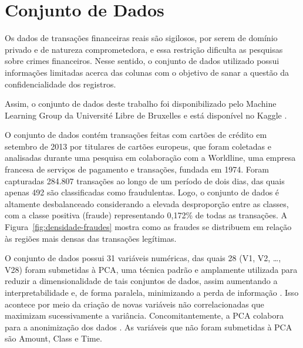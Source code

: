 \documentclass{uflamon}          %
\begin{document}
\section{Conjunto de Dados}

Os dados de transações financeiras reais são sigilosos, por serem de domínio privado e de natureza comprometedora, e essa restrição dificulta as pesquisas sobre crimes financeiros. Nesse sentido, o conjunto de dados utilizado possui informações limitadas acerca das colunas com o objetivo de sanar a questão da confidencialidade dos registros.

Assim, o conjunto de dados deste trabalho foi disponibilizado pelo Machine Learning Group da Université Libre de Bruxelles e está disponível no Kaggle \cite{kaggle2018}.

O conjunto de dados contém transações feitas com cartões de crédito em setembro de 2013 por titulares de cartões europeus, que foram coletadas e analisadas durante uma pesquisa em colaboração com a Worldline, uma empresa francesa de serviços de pagamento e transações, fundada em 1974. Foram capturadas 284.807 transações ao longo de um período de dois dias, das quais apenas 492 são classificadas como fraudulentas. Logo, o conjunto de dados é altamente desbalanceado considerando a elevada desproporção entre as classes, com a classe positiva (fraude) representando 0,172\% de todas as transações. A Figura~\ref{fig:densidade-fraudes} mostra como as fraudes se distribuem em relação às regiões mais densas das transações legítimas.

O conjunto de dados possui 31 variáveis numéricas, das quais 28 (V1, V2, \dots, V28) foram submetidas à PCA, uma técnica padrão e amplamente utilizada para reduzir a dimensionalidade de tais conjuntos de dados, assim aumentando a interpretabilidade e, de forma paralela, minimizando a perda de informação \cite{abdi2010}. Isso acontece por meio da criação de novas variáveis não correlacionadas que maximizam sucessivamente a variância. Concomitantemente, a PCA colabora para a anonimização dos dados \cite{alarfaj2022}. As variáveis que não foram submetidas à PCA são Amount, Class e Time.
\end{document}
